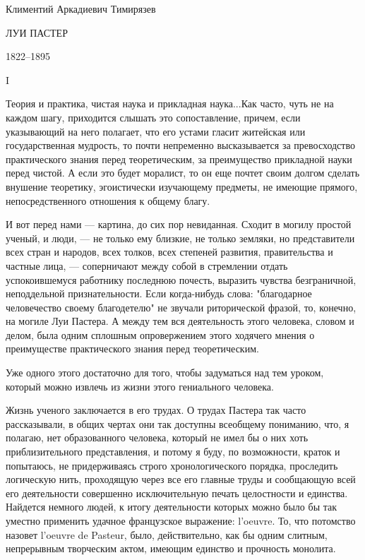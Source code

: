 Климентий Аркадиевич Тимирязев


ЛУИ ПАСТЕР

1822--1895

I

Теория и практика,  чистая наука и прикладная  наука...Как часто, чуть
не  на  каждом шагу,  приходится  слышать  это сопоставление,  причем,
если указывающий  на него  полагает, что  его устами  гласит житейская
или  государственная  мудрость,   то  почти  непременно  высказывается
за   превосходство  практического   знания  перед   теоретическим,  за
преимущество прикладной науки перед чистой. А если это будет моралист,
то он еще почтет своим долгом сделать внушение теоретику, эгоистически
изучающему предметы, не имеющие прямого, непосредственного отношения к
общему благу.

И вот перед  нами --- картина, до сих пор  невиданная. Сходит в могилу
простой  ученый,  и  люди,  ---  не  только  ему  близкие,  не  только
земляки,  но представители  всех стран  и народов,  всех толков,  всех
степеней развития, правительства и частные лица, --- соперничают между
собой в стремлении отдать  успокоившемуся работнику последнюю почесть,
выразить  чувства  безграничной,  неподдельной  признательности.  Если
когда-нибудь слова:  "благодарное человечество своему  благодетелю" не
звучали риторической  фразой, то,  конечно, на  могиле Луи  Пастера. А
между  тем  вся деятельность  этого  человека,  словом и  делом,  была
одним  сплошным опровержением  этого  ходячего  мнения о  преимуществе
практического знания перед теоретическим.

Уже одного этого достаточно для того, чтобы задуматься над тем уроком,
который можно извлечь из жизни этого гениального человека.

Жизнь ученого  заключается в  его трудах. О  трудах Пастера  так часто
рассказывали,  в общих  чертах они  так доступны  всеобщему пониманию,
что, я полагаю,  нет образованного человека, который не имел  бы о них
хоть приблизительного представления, и  потому я буду, по возможности,
краток и попытаюсь, не  придерживаясь строго хронологического порядка,
проследить логическую нить,  проходящую через все его  главные труды и
сообщающую  всей  его  деятельности совершенно  исключительную  печать
целостности и  единства. Найдется немного людей,  к итогу деятельности
которых  можно  было  бы  так уместно  применить  удачное  французское
выражение: l'oeuvre.  То, что  потомство назовет l'oeuvre  de Pasteur,
было,  действительно, как  бы  одним  слитным, непрерывным  творческим
актом, имеющим единство и прочность монолита.

